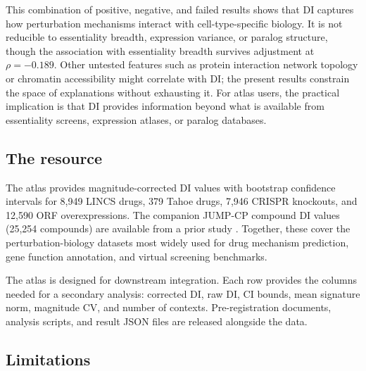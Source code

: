 \documentclass[11pt]{article}
\begin{document}
This combination of positive, negative, and failed results shows that DI
captures how perturbation mechanisms interact with
cell-type-specific biology.  It is not reducible to essentiality breadth,
expression variance, or paralog structure, though the association with
essentiality breadth survives adjustment at $\rho = -0.189$.  Other untested features
such as protein interaction network topology or chromatin accessibility
might correlate with DI; the present results constrain the space of
explanations without exhausting it.  For atlas users, the practical
implication is that DI provides information beyond what is available
from essentiality screens, expression atlases, or paralog databases.

\subsection{The resource}

The atlas provides magnitude-corrected DI values with bootstrap
confidence intervals for 8{,}949 LINCS drugs, 379 Tahoe drugs, 7{,}946
CRISPR knockouts, and 12{,}590 ORF overexpressions.  The companion JUMP-CP
compound DI values (25{,}254 compounds) are available from a prior
study \citep{tower2026confound}.  Together, these cover the
perturbation-biology datasets most widely used for drug mechanism
prediction, gene function annotation, and virtual screening
benchmarks.

The atlas is designed for downstream integration.  Each row provides the
columns needed for a secondary analysis: corrected DI, raw DI, CI
bounds, mean signature norm, magnitude CV, and number of contexts.
Pre-registration documents, analysis scripts, and result JSON files are
released alongside the data.

\subsection{Limitations}
\end{document}
